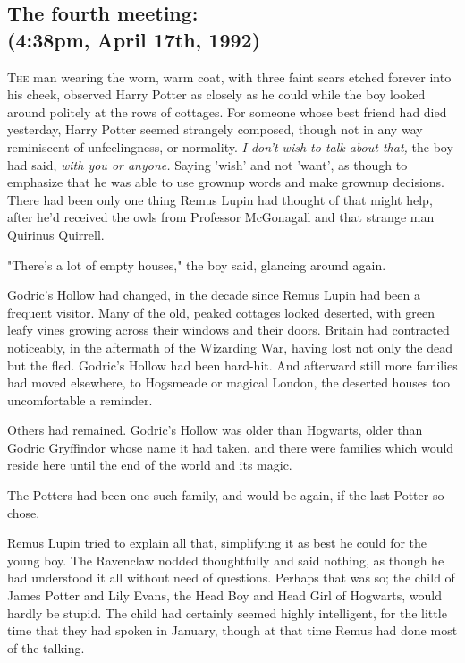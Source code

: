 
\subsection{The fourth meeting:\\
(4:38pm, April 17th, 1992)}

\lettrine{T}{he} man wearing the worn, warm coat, with three faint scars etched forever into 
his cheek, observed Harry Potter as closely as he could while the boy looked 
around politely at the rows of cottages. For someone whose best friend had died 
yesterday, Harry Potter seemed strangely composed, though not in any way 
reminiscent of unfeelingness, or normality. \emph{I don't wish to talk about 
that,} the boy had said, \emph{with you or anyone.} Saying 'wish' and not 
'want', as though to emphasize that he was able to use grownup words and make 
grownup decisions. There had been only one thing Remus Lupin had thought of 
that might help, after he'd received the owls from Professor McGonagall and 
that strange man Quirinus Quirrell.

"There's a lot of empty houses," the boy said, glancing around again.

Godric's Hollow had changed, in the decade since Remus Lupin had been a 
frequent visitor. Many of the old, peaked cottages looked deserted, with green 
leafy vines growing across their windows and their doors. Britain had 
contracted noticeably, in the aftermath of the Wizarding War, having lost not 
only the dead but the fled. Godric's Hollow had been hard-hit. And afterward 
still more families had moved elsewhere, to Hogsmeade or magical London, the 
deserted houses too uncomfortable a reminder.

Others had remained. Godric's Hollow was older than Hogwarts, older than Godric 
Gryffindor whose name it had taken, and there were families which would reside 
here until the end of the world and its magic.

The Potters had been one such family, and would be again, if the last Potter so 
chose.

Remus Lupin tried to explain all that, simplifying it as best he could for the 
young boy. The Ravenclaw nodded thoughtfully and said nothing, as though he had 
understood it all without need of questions. Perhaps that was so; the child of 
James Potter and Lily Evans, the Head Boy and Head Girl of Hogwarts, would 
hardly be stupid. The child had certainly seemed highly intelligent, for the 
little time that they had spoken in January, though at that time Remus had done 
most of the talking.

